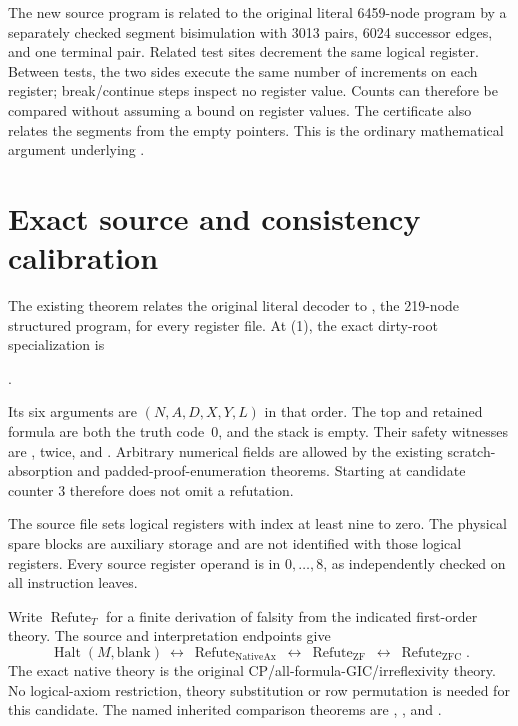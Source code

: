 \documentclass[11pt]{article}
\newcommand{\Halt}{\operatorname{Halt}}
\newcommand{\Refute}{\operatorname{Refute}}
\begin{document}
The new source program is related to the original literal 6459-node
program by a separately checked segment bisimulation with 3013 pairs,
6024 successor edges, and one terminal pair. Related test sites decrement
the same logical register. Between tests, the two sides execute the same
number of increments on each register; break/continue steps inspect no
register value. Counts can therefore be compared without assuming a bound
on register values. The certificate also relates the segments from the
empty pointers. This is the ordinary mathematical argument underlying
.

\section{Exact source and consistency calibration}

The existing theorem  relates the original
literal decoder to , the 219-node structured
program, for every register file. At (1), the exact dirty-root
specialization is
\begin{center}\small
{}.
\end{center}
Its six arguments are $(N,A,D,X,Y,L)$ in that order. The top and retained
formula are both the truth code~0, and the stack is empty. Their safety
witnesses are , twice, and
. Arbitrary numerical fields are allowed by the
existing scratch-absorption and padded-proof-enumeration theorems. Starting
at candidate counter 3 therefore does not omit a refutation.

The source file  sets logical registers with index at least
nine to zero. The physical spare blocks are auxiliary storage and are
not identified with those logical registers. Every source register operand
is in $0,\ldots,8$, as independently checked on all instruction leaves.

Write $\Refute_T$ for a finite derivation of falsity from the indicated
first-order theory. The source and interpretation endpoints give
\[
 \Halt(M,\mathrm{blank})
 \ \longleftrightarrow\ \Refute_{\mathrm{NativeAx}}
 \ \longleftrightarrow\ \Refute_{\mathrm{ZF}}
 \ \longleftrightarrow\ \Refute_{\mathrm{ZFC}}.              \tag{5}
\]
The exact native theory is the original CP/all-formula-GIC/irreflexivity
theory. No logical-axiom restriction, theory substitution or row permutation
is needed for this candidate. The named inherited comparison theorems are
,
, and
.
\end{document}
